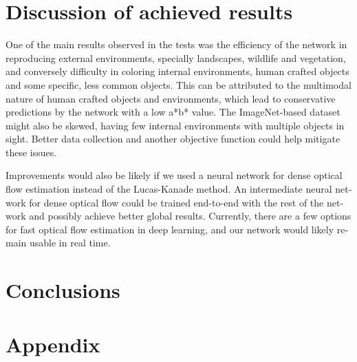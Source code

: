 \documentclass[12pt,openright,oneside,a4paper,english]{abntex2}
\begin{document}
\begin{otherlanguage}{english}
\chapter{Discussion of achieved results}
One of the main results observed in the tests was the efficiency of the network in reproducing external environments, specially landscapes, wildlife and vegetation, and conversely difficulty in coloring internal environments, human crafted objects and some specific, less common objects. This can be attributed to the multimodal nature of human crafted objects and environments, which lead to conservative predictions by the network with a low a*b* value.  The ImageNet-based dataset might also be skewed, having few internal environments with multiple objects in sight. Better data collection and another objective function could help mitigate these issues.

Improvements would also be likely if we used a neural network for dense optical flow estimation instead of the Lucas-Kanade method. An intermediate neural network for dense optical flow could be trained end-to-end with the rest of the network and possibly achieve better global results. Currently, there are a few options for fast optical flow estimation in deep learning, and our network would likely remain usable in real time.

\chapter{Conclusions}


\chapter{Appendix}


\end{otherlanguage}
\end{document}

